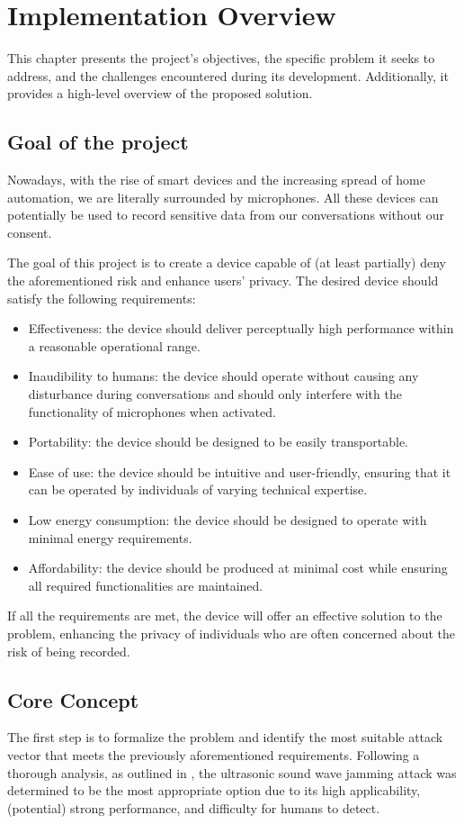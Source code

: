 \chapter{Implementation Overview}
This chapter presents the project's objectives, the specific problem it seeks to address, and the challenges encountered during its development. 
Additionally, it provides a high-level overview of the proposed solution.

\section{Goal of the project}
Nowadays, with the rise of smart devices and the increasing spread of home automation, we are literally surrounded by microphones.
All these devices can potentially be used to record sensitive data from our conversations without our consent.

The goal of this project is to create a device capable of (at least partially) deny the aforementioned risk and enhance users' privacy.
The desired device should satisfy the following requirements:
\begin{itemize}
    \item Effectiveness: the device should deliver perceptually high performance within a reasonable operational range.
    \item Inaudibility to humans: the device should operate without causing any disturbance during conversations and should only interfere with the functionality of microphones when activated.
    \item Portability: the device should be designed to be easily transportable.
    \item Ease of use: the device should be intuitive and user-friendly, ensuring that it can be operated by individuals of varying technical expertise.
    \item Low energy consumption: the device should be designed to operate with minimal energy requirements.
    \item Affordability: the device should be produced at minimal cost while ensuring all required functionalities are maintained.
\end{itemize}
If all the requirements are met, the device will offer an effective solution to the problem, enhancing the privacy of individuals who are often concerned about the risk of being recorded.

\section{Core Concept}
The first step is to formalize the problem and identify the most suitable attack vector that meets the previously aforementioned requirements.
Following a thorough analysis, as outlined in , the ultrasonic sound wave jamming attack was determined to be the most appropriate option due to its high applicability, (potential) strong performance, and difficulty for humans to detect.

